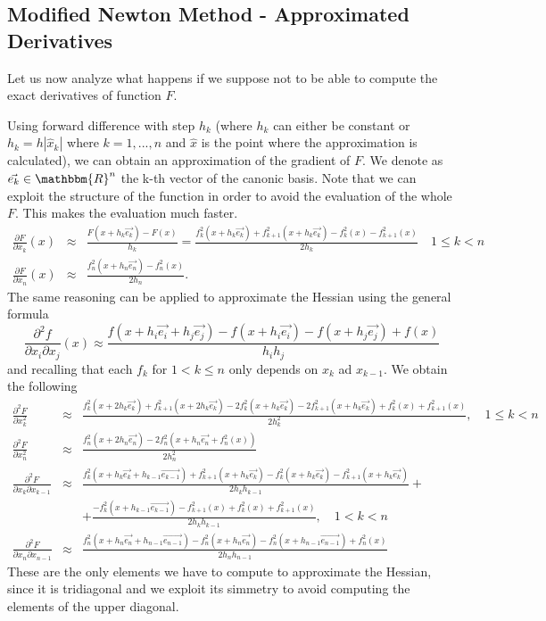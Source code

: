 \medskip
\subsection*{Modified Newton Method - Approximated Derivatives}
Let us now analyze what happens if we suppose not to be able to compute the exact derivatives of function $F$.

Using forward difference with step $h_k$ (where $h_k$ can either be constant or $h_k=h|\hat{x}_k|$ where $k=1,...,n$ and $\hat{x}$ is the point 
where the approximation is calculated), we can obtain an approximation of the gradient of $F$. We denote as $\vec{e_k} \in \mathbbm{R}^n$ the k-th vector of the canonic basis. 
Note that we can exploit the structure of the function
in order to avoid the evaluation of the whole $F$. This makes the evaluation much faster.
\begin{eqnarray*}
    \frac{\partial F}{\partial x_k}(x) &\approx& \frac{F(x+h_k \vec{e_k})-F(x)}{h_k} 
    = \frac{f_k^2(x+h_k \vec{e_k}) +f_{k+1}^2(x+h_k\vec{e_k}) -f_k^2(x) -f_{k+1}^2(x) }{2h_k} \quad 1\leq k<n \\
    \frac{\partial F}{\partial x_n}(x) &\approx& \frac{f_n^2(x+h_n\vec{e_n}) - f_n^2(x)}{2h_n}.
\end{eqnarray*}
The same reasoning can be applied to approximate the Hessian using the general formula 
$$\frac{\partial^2 f}{\partial x_i \partial x_j} (x) \approx \frac{f(x+h_i\vec{e_i}+h_j\vec{e_j}) - f(x+h_i\vec{e_i}) - f(x+h_j\vec{e_j}) + f(x) }{h_ih_j}$$
and recalling that each $f_k$ for $1<k\leq n$ only depends on $x_k$ ad $x_{k-1}$. We obtain the following 
\begin{eqnarray*}
    \frac{\partial^2 F}{\partial x_k^2} &\approx& \frac{f_k^2(x+2h_k\vec{e_k}) + f_{k+1}^2(x+2h_k\vec{e_k}) -2f_k^2(x+h_k\vec{e_k}) -2f_{k+1}^2(x+h_k\vec{e_k}) +f_k^2(x) + f_{k+1}^2(x) }{2h_k^2}, \quad 1 \leq k <n \\
    \frac{\partial^2 F}{\partial x_n^2} &\approx& \frac{f_n^2(x+2h_n\vec{e_n}) - 2f_n^2(x+h_n\vec{e_n} + f_n^2(x)) }{2h_n^2} \\
    \frac{\partial^2 F}{\partial x_k \partial x_{k-1}} &\approx& \frac{f_k^2(x+h_k\vec{e_k}+h_{k-1}\vec{e_{k-1}}) + f_{k+1}^2(x+h_k\vec{e_k}) -f_k^2(x+h_k\vec{e_k}) -f_{k+1}^2(x+h_k\vec{e_k})}{2h_k h_{k-1}} + \\
    && + \frac{ -f_k^2(x+h_{k-1}\vec{e_{k-1}}) -f_{k+1}^2(x) +f_k^2(x) + f_{k+1}^2(x) }{2h_k h_{k-1}}, \quad 1<k<n \\
    \frac{\partial^2 F}{\partial x_n \partial x_{n-1}} &\approx& \frac{f_n^2(x+h_n\vec{e_n}+h_{n-1}\vec{e_{n-1}}) -f_n^2(x+h_n\vec{e_n}) -f_n^2(x+h_{n-1}\vec{e_{n-1}}) +f_n^2(x) }{2h_n h_{n-1}}
\end{eqnarray*}
These are the only elements we have to compute to approximate the Hessian, since it is tridiagonal and we exploit its simmetry to avoid computing 
the elements of the upper diagonal.

